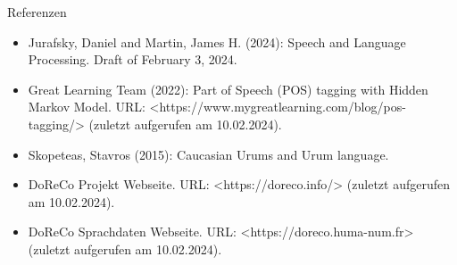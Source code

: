 \documentclass{beamer}
\begin{document}
\begin{frame}[t]{Referenzen}
	\begin{itemize}
		\item Jurafsky, Daniel and Martin, James H. (2024): Speech and Language Processing. Draft of February 3, 2024.
		\item Great Learning Team (2022): Part of Speech (POS) tagging with Hidden Markov Model. URL: <https://www.mygreatlearning.com/blog/pos-tagging/> (zuletzt aufgerufen am 10.02.2024).
		\item Skopeteas, Stavros (2015): Caucasian Urums and Urum language.
		\item DoReCo Projekt Webseite. URL: <https://doreco.info/> (zuletzt aufgerufen am 10.02.2024).
		\item DoReCo Sprachdaten Webseite. URL: <https://doreco.huma-num.fr> (zuletzt aufgerufen am 10.02.2024).
	\end{itemize}
\end{frame}
\end{document}

